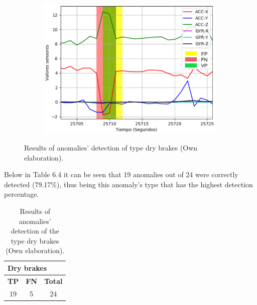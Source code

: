 \begin{figure}[H]
{\begin{varwidth}{\textwidth}
\begin{subfigure}[h]{0.45\textwidth}
            \includegraphics[width=\textwidth]{imagenes/Cap5/freno3}
        \end{subfigure} 
        \end{varwidth}}
        \caption{Results of anomalies' detection of type dry brakes (Own elaboration).}
		\label{fig:resultados_frenos}
    \end{figure}

Below in Table 6.4 it can be seen that 19 anomalies out of 24 were correctly detected (79.17\%), thus being this anomaly's type that has the highest detection percentage.

\begin{table}[H]
\centering
\begin{center}
\begin{tabular}{|c|c|c|}
\hline
\multicolumn{3}{|l|}{\textbf{Dry brakes}} \\ \hline
\textbf{TP}   & \textbf{FN}   & \textbf{Total}  \\ \hline
\cellcolor[HTML]{AADD99}19  & \cellcolor[HTML]{DF9F9F}5  & 24             \\ \hline
\end{tabular}
\caption{Results of anomalies' detection of the type dry brakes (Own elaboration).}
\label{table:frenos_resultado}
\end{center}
\end{table}

